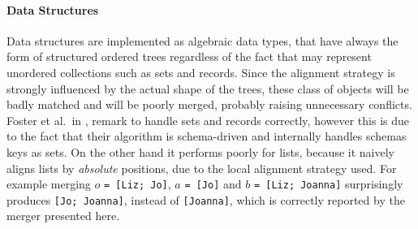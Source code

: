 \documentclass[../Thesis.tex]{subfiles}
\begin{document}
	\paragraph{Data Structures}
	Data structures are implemented as algebraic data types, that 
	have always the form of structured ordered trees
	regardless of the fact that may represent unordered collections such as 	
	sets and records. Since the alignment strategy is strongly influenced by 
	the actual shape of the trees, these class of objects will be 
	badly matched and will be poorly merged, probably raising 
	unnecessary conflicts.
	Foster et al.\ in \cite{Pierce07}, remark to handle sets and records 
	correctly, however this is due to the fact that their algorithm is 
	schema-driven and internally handles schemas keys as sets. 
	On the other hand it performs poorly for lists, 
	because it naively aligns lists by \emph{absolute} positions, due to the 
	local alignment strategy used. 
	For example merging $o$ \texttt{= [Liz; Jo]}, $a$ \texttt{= [Jo]} and $b$ 
	\texttt{= [Liz; Joanna]} surprisingly produces \texttt{[Jo; Joanna]}, instead
	of \texttt{[Joanna]}, 
	which is correctly reported by the merger presented here.
	
\end{document}

